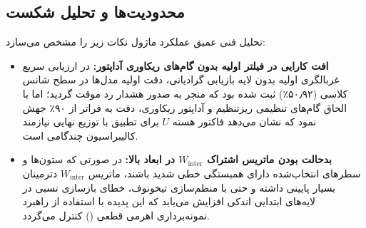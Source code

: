 \subsection{محدودیت‌ها و تحلیل شکست}
تحلیل فنی عمیق عملکرد ماژول نکات زیر را مشخص می‌سازد:
\begin{itemize}
    \item \textbf{افت کارایی در فیلتر اولیه بدون گام‌های ریکاوری آداپتور:} در ارزیابی سریع غربالگری اولیه بدون لایه بازیابی گرادیانی، دقت اولیه مدل‌ها در سطح شانس کلاسی (۵۰٫۹۲٪) ثبت شده بود که منجر به صدور هشدار رد موقت گردید؛ اما با الحاق گام‌های تنظیمی ریزتنظیم و آداپتور ریکاوری، دقت به فراتر از ۹۰٪ جهش نمود که نشان می‌دهد فاکتور هسته $U$ برای تطبیق با توزیع نهایی نیازمند کالیبراسیون چندگامی است.
    \item \textbf{بدحالت بودن ماتریس اشتراک $W_{\text{inter}}$ در ابعاد بالا:} در صورتی که ستون‌ها و سطرهای انتخاب‌شده دارای همبستگی خطی شدید باشند، ماتریس $W_{\text{inter}}$ دترمینان بسیار پایینی داشته و حتی با منظم‌سازی تیخونوف، خطای بازسازی نسبی در لایه‌های ابتدایی اندکی افزایش می‌یابد که این پدیده با استفاده از راهبرد نمونه‌برداری اهرمی قطعی () کنترل می‌گردد.
\end{itemize}
